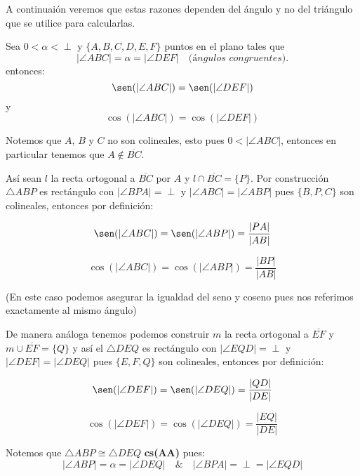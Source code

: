 A continuaión veremos que estas razones dependen del ángulo y no del triángulo que se utilice para calcularlas.

\begin{prop}\label{bndef}
Sea $0 < \alpha < \perp$ y $\{ A,B,C,D,E,F\}$ puntos en el plano tales que
\[ |\angle ABC| = \alpha = |\angle DEF| \quad \textit{(ángulos congruentes).}\]
entonces:
\[ \sen( |\angle ABC|) = \sen( |\angle DEF|)\] y
\[ \cos( |\angle ABC|) = \cos( |\angle DEF|)\]

\begin{pba}
Notemos que $A$, $B$ y $C$ no son colineales, esto pues $ 0<|\angle ABC|$, entonces en particular tenemos que $A\notin \overline{BC}$.

Así sean $\mathit{l}$ la recta ortogonal a $\overline{BC}$ por $A$ y $\mathit{l} \cap \overline{BC} = \{P\}$. Por construcción $\triangle ABP$ es rectángulo con $|\angle BPA| = \perp$ y $|\angle ABC| = |\angle ABP|$ pues $\{B,P,C\}$ son colineales, entonces por definición:

\begin{equation}\label{trig1}
\sen( |\angle ABC|)=  \sen(|\angle ABP|) = \frac{|PA|}{|AB|}
\end{equation}

\begin{equation}\label{trig2}
\cos( |\angle ABC|)=  \cos(|\angle ABP|) = \frac{|BP|}{|AB|}
\end{equation}

(En este caso podemos asegurar la igualdad del seno y coseno pues nos referimos exactamente al mismo ángulo)
 
De manera análoga tenemos podemos construir $\mathit{m}$ la recta ortogonal a $\overline{EF}$ y $\mathit{m} \cup \overline{EF} = \{Q\}$ y así el $\triangle DEQ$ es rectángulo con $|\angle EQD| = \perp$ y  $|\angle DEF| = |\angle DEQ|$ pues $\{E,F,Q\}$ son colineales, entonces por definición:

\begin{equation}\label{trig3}
\sen( |\angle DEF|)=  \sen(|\angle DEQ|) = \frac{|QD|}{|DE|}
\end{equation}

\begin{equation}\label{trig4}
       \cos( |\angle DEF|)=  \cos(|\angle DEQ|) = \frac{|EQ|}{|DE|}
\end{equation}

Notemos que $\triangle ABP \cong \triangle DEQ$ \textbf{cs(AA)} pues:
\[ |\angle ABP| = \alpha = |\angle DEQ| \quad\&\quad |\angle BPA| = \perp = |\angle EQD| \]


\end{pba}
\end{prop}
